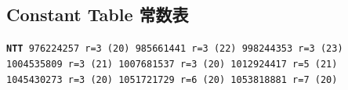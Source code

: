 				\subsection{Constant Table 常数表}
				\label{randomprimes}
				\begin{small}
					\setlength{\parindent}{0em}\setlength{\parskip}{0em}\renewcommand{\baselinestretch}{.8}
					\texttt{}
					\texttt{\textbf{NTT} 976224257 r=3 (20)
					985661441 r=3 (22)
					998244353 r=3 (23)\\
					1004535809 r=3 (21)
					1007681537 r=3 (20)
					1012924417 r=5 (21)\\
					1045430273 r=3 (20)
					1051721729 r=6 (20)
					1053818881 r=7 (20)
					}
				\end{small}
